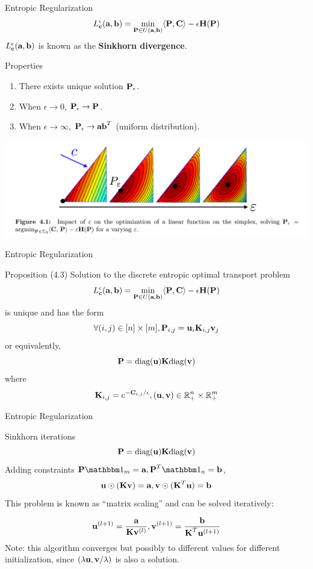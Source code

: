 \documentclass{beamer}
\renewcommand{\b}{\textbf}
\newcommand{\mb}{\mathbb}
\newcommand{\mbm}{\mathbbm}
\begin{document}
\begin{frame}{Entropic Regularization} 
  \[L_{\b c}^\epsilon(\b a,\b b) = \min_{\b P\in U(\b a, \b b)}\langle {\b P,
      \b C} \rangle - \epsilon\b H(\b P)\]
  $L_{\b c}^\epsilon(\b a,\b b)$ is known as the \textbf{Sinkhorn divergence}.
  \begin{block}{Properties}
    \begin{enumerate}
    \item There exists unique solution $\b P_\epsilon$.
      \item When $\epsilon\to 0$, $\b P_\epsilon\to \b P$.
      \item When $\epsilon\to \infty$, $\b P_\epsilon\to \b a\b b^T$ (uniform distribution).
    \end{enumerate}
    \includegraphics[width=\textwidth]{./images/entropy.png}
  \end{block}
\end{frame}

\begin{frame}{Entropic Regularization} 
  \begin{block}{Proposition (4.3)}
    Solution to the discrete entropic optimal transport problem
    \[L_{\b c}^\epsilon(\b a,\b b) = \min_{\b P\in U(\b a, \b b)}\langle {\b P,
        \b C} \rangle - \epsilon\b H(\b P)\]
    is unique and has the form
    \[\forall (i, j)\in [n]\times [m], \b P_{i, j}=\b u_i \b K_{i,j}\b v_j\]
    or equivalently,
    \[\b P = \mbox{diag}(\b u)\b K \mbox{diag}(\b v)\]
    where
    \[\b K_{i,j} = e^{-\b C_{i,j}/\epsilon}, (\b u,\b v)\in \mb R_+^n\times \mb R_+^m\]
    
  \end{block}
\end{frame}

\begin{frame}{Entropic Regularization} 
  \begin{block}{Sinkhorn iterations}
    \[\b P = \mbox{diag}(\b u)\b K \mbox{diag}(\b v)\]
    Adding constraints $\b P \mbm 1_m = \b a, \b P^T \mbm 1_n = \b b$,
    \[\b u \odot (\b K \b v) = \b a, \b v \odot (\b K^T \b u) = \b b\]
    This problem is known as ``matrix scaling'' and can be solved iteratively:

    \[\b u^{(l+1)} = \frac{\b a}{\b K \b v^{(l)}}, \b v^{(l+1)} = \frac{\b b}{\b K^T \b u^{(l+1)}} \]
    Note: this algorithm converges but possibly to different values for
    different initialization, since $(\lambda \b u, \b v/\lambda)$ is also a solution.
  \end{block}
\end{frame}
\end{document}
